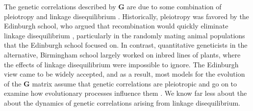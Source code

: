 \documentclass[9pt,twocolumn,twoside]{gsajnl}
\newcommand{\G}{\textbf{G }}
\begin{document}
The genetic correlations described by \G are due to some combination of pleiotropy and linkage disequilibrium \citep{Saltz2017}. Historically, pleiotropy was favored by the Edinburgh school, who argued that recombination would quickly eliminate linkage disequilibrium \citep[Chapter~20]{fox2006evolutionary}, particularly in the randomly mating animal populations that the Edinburgh school focused on. In contrast, quantitative geneticists in the alternative, Birmingham school largely worked on inbred lines of plants, where the effects of linkage disequilibrium were impossible to ignore. The Edinburgh view came to be widely accepted, and as a result, most models for the evolution of the \G  matrix assume that genetic correlations are pleiotropic and go on to examine how evolutionary processes influence them \citep{Turelli1988}. We know far less about the about the dynamics of genetic correlations arising from linkage disequilibrium.\par
% 
% 
\end{document}
